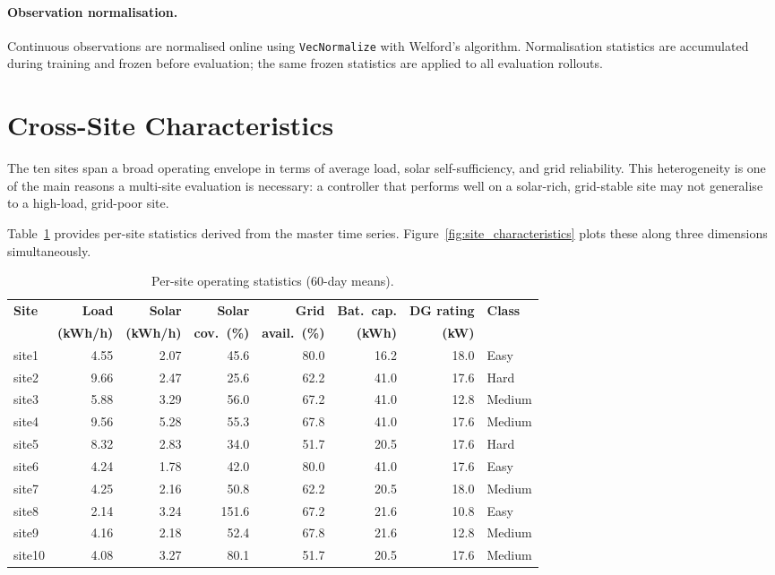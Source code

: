 \paragraph{Observation normalisation.}
Continuous observations are normalised online using \texttt{VecNormalize}
with Welford's algorithm.  Normalisation statistics are accumulated during
training and frozen before evaluation; the same frozen statistics are applied
to all evaluation rollouts.


\section{Cross-Site Characteristics}
\label{sec:site_characteristics}

The ten sites span a broad operating envelope in terms of average load,
solar self-sufficiency, and grid reliability.  This heterogeneity is one of
the main reasons a multi-site evaluation is necessary: a controller that
performs well on a solar-rich, grid-stable site may not generalise to a
high-load, grid-poor site.

Table~\ref{tab:site_stats} provides per-site statistics derived from the
master time series.  Figure~\ref{fig:site_characteristics} plots these along
three dimensions simultaneously.

\begin{table}[htb]
\centering
\small
\caption{Per-site operating statistics (60-day means).}
\label{tab:site_stats}
\begin{tabular}{lrrrrrrl}
\toprule
\textbf{Site} & \textbf{Load} & \textbf{Solar} & \textbf{Solar} & \textbf{Grid} &
\textbf{Bat.\ cap.} & \textbf{DG rating} & \textbf{Class} \\
 & \textbf{(kWh/h)} & \textbf{(kWh/h)} & \textbf{cov.\ (\%)} &
\textbf{avail.\ (\%)} & \textbf{(kWh)} & \textbf{(kW)} & \\
\midrule
site1  & 4.55 & 2.07 &  45.6 & 80.0 & 16.2 & 18.0 & Easy   \\
site2  & 9.66 & 2.47 &  25.6 & 62.2 & 41.0 & 17.6 & Hard   \\
site3  & 5.88 & 3.29 &  56.0 & 67.2 & 41.0 & 12.8 & Medium \\
site4  & 9.56 & 5.28 &  55.3 & 67.8 & 41.0 & 17.6 & Medium \\
site5  & 8.32 & 2.83 &  34.0 & 51.7 & 20.5 & 17.6 & Hard   \\
site6  & 4.24 & 1.78 &  42.0 & 80.0 & 41.0 & 17.6 & Easy   \\
site7  & 4.25 & 2.16 &  50.8 & 62.2 & 20.5 & 18.0 & Medium \\
site8  & 2.14 & 3.24 & 151.6 & 67.2 & 21.6 & 10.8 & Easy   \\
site9  & 4.16 & 2.18 &  52.4 & 67.8 & 21.6 & 12.8 & Medium \\
site10 & 4.08 & 3.27 &  80.1 & 51.7 & 20.5 & 17.6 & Medium \\
\bottomrule
\end{tabular}
\end{table}


